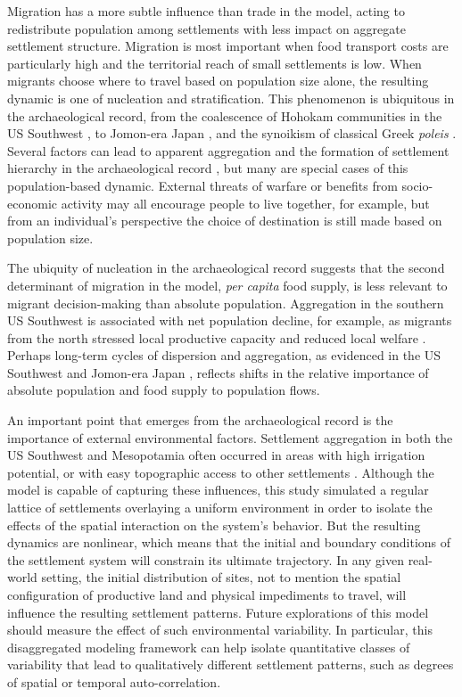 \documentclass{article}
\begin{document}
Migration has a more subtle influence than trade in the model, acting to redistribute population among settlements with less impact on aggregate settlement structure. Migration is most important when food transport costs are particularly high and the territorial reach of small settlements is low. When migrants choose where to travel based on population size alone, the resulting dynamic is one of nucleation and stratification. This phenomenon is ubiquitous in the archaeological record, from the coalescence of Hohokam communities in the US Southwest \parencite{Hill2004}, to Jomon-era Japan \parencite{Crema2013CyclesBay}, and the synoikism of classical Greek \emph{poleis} \parencite{Mackil2004}. Several factors can lead to apparent aggregation and the formation of settlement hierarchy in the archaeological record \parencite{Duffy2011SiteSocieties}, but many are special cases of this population-based dynamic. External threats of warfare or benefits from socio-economic activity may all encourage people to live together, for example, but from an individual's perspective the choice of destination is still made based on population size. 

The ubiquity of nucleation in the archaeological record suggests that the second determinant of migration in the model, \emph{per capita} food supply, is less relevant to migrant decision-making than absolute population. Aggregation in the southern US Southwest is associated with net population decline, for example, as migrants from the north stressed local productive capacity and reduced local welfare \parencite{Hill2004}. Perhaps long-term cycles of dispersion and aggregation, as evidenced in the US Southwest and Jomon-era Japan \parencite{Crema2013CyclesBay}, reflects shifts in the relative importance of absolute population and food supply to population flows. 

An important point that emerges from the archaeological record is the importance of external environmental factors. Settlement aggregation in both the US Southwest and Mesopotamia often occurred in areas with high irrigation potential, or with easy topographic access to other settlements \parencite{Hill2004,Lawrence2016}. Although the model is capable of capturing these influences, this study simulated a regular lattice of settlements overlaying a uniform environment in order to isolate the effects of the spatial interaction on the system's behavior. But the resulting dynamics are nonlinear, which means that the initial and boundary conditions of the settlement system will constrain its ultimate trajectory. In any given real-world setting, the initial distribution of sites, not to mention the spatial configuration of productive land and physical impediments to travel, will influence the resulting settlement patterns. Future explorations of this model should measure the effect of such environmental variability. In particular, this disaggregated modeling framework can help isolate quantitative classes of variability that lead to qualitatively different settlement patterns, such as degrees of spatial or temporal auto-correlation.
\end{document}
